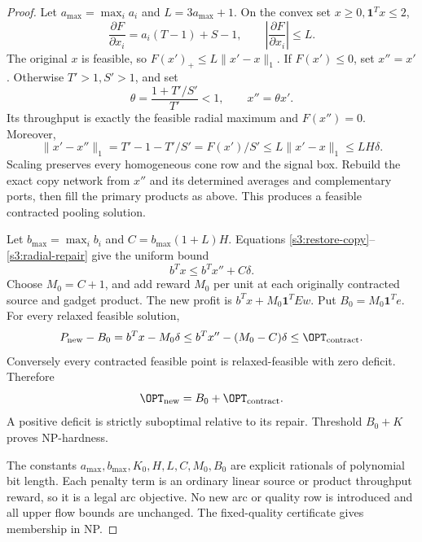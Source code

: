 \begin{proof}
Let $a_{\max}=\max_i a_i$ and $L=3a_{\max}+1$. On the convex set
$x\ge0,\mathbf1^Tx\le2$,
\[
 \frac{\partial F}{\partial x_i}=a_i(T-1)+S-1,
 \qquad \left|\frac{\partial F}{\partial x_i}\right|\le L.
\]
The original $x$ is feasible, so $F(x')_+\le L\|x'-x\|_1$.
If $F(x')\le0$, set $x''=x'$. Otherwise $T'>1,S'>1$, and set
\[
 \theta=\frac{1+T'/S'}{T'}<1,\qquad x''=\theta x'.
\]
Its throughput is exactly the feasible radial maximum and $F(x'')=0$.
Moreover,
\begin{equation}
 \|x'-x''\|_1=T'-1-T'/S'=F(x')/S'
 \le L\|x'-x\|_1\le LH\delta.\label{s3:radial-repair}
\end{equation}
Scaling preserves every homogeneous cone row and the signal box.
Rebuild the exact copy network from $x''$ and its determined averages
and complementary ports, then fill the primary products as above.
This produces a feasible contracted pooling solution.

Let $b_{\max}=\max_i b_i$ and $C=b_{\max}(1+L)H$. Equations
\eqref{s3:restore-copy}--\eqref{s3:radial-repair} give the uniform bound
\begin{equation}
 b^Tx\le b^Tx''+C\delta.\label{s3:profit-repair}
\end{equation}
Choose $M_0=C+1$, and add reward $M_0$ per unit at each originally
contracted source and gadget product. The new profit is
$b^Tx+M_0\mathbf1^TEw$. Put $B_0=M_0\mathbf1^Te$.
For every relaxed feasible solution,
\[
 P_{\rm new}-B_0=b^Tx-M_0\delta
 \le b^Tx''-(M_0-C)\delta\le\OPT_{\rm contract}.
\]
Conversely every contracted feasible point is relaxed-feasible with
zero deficit. Therefore
\begin{equation}
 \OPT_{\rm new}=B_0+\OPT_{\rm contract}.\label{s3:penalty-value}
\end{equation}
A positive deficit is strictly suboptimal relative to its repair.
Threshold $B_0+K$ proves NP-hardness.

The constants $a_{\max},b_{\max},K_0,H,L,C,M_0,B_0$ are explicit
rationals of polynomial bit length. Each penalty term is an ordinary
linear source or product throughput reward, so it is a legal arc
objective. No new arc or quality row is introduced and all upper flow
bounds are unchanged. The fixed-quality certificate gives membership
in NP.


\end{proof}
